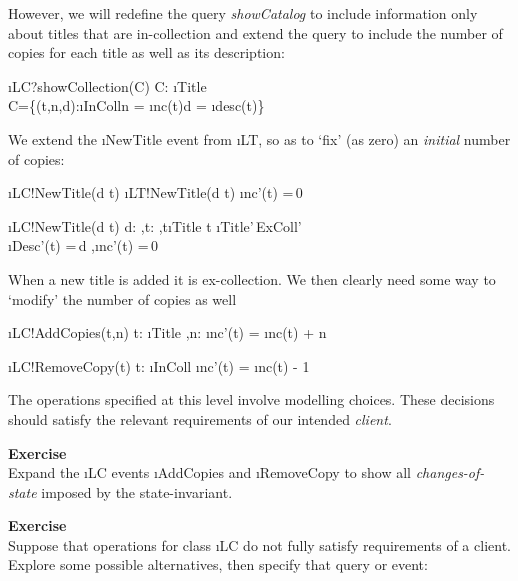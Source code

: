 \documentclass[12pt,a4paper]{article}
\newcounter{exer} %
\newcommand{\exer} %
	{\stepcounter{exer}{\;\arabic{exer}}}
\begin{document}
\newpage
\noindent However, we will redefine the query \emph{showCatalog} to include
information only about titles that are in-collection and extend the query to include the
number of copies for each title as well as its description:
\begin{showspecs}
	\begin{spec}{\i{LC?showCollection(\to C)}}
		C: \i{Title}\pfun{}\!\times{}\\
		C\!=\!\{(t,n,d):\i{InColl}\times{}\!\times{}\bullet n = \i{nc}(t)\wedge d = \i{desc}(t)\}
	\end{spec}
\end{showspecs}


\smallskip\noindent We extend the \i{NewTitle} event from \i{LT},
so as to `fix' (as zero) an \emph{initial} number of copies:
\begin{showspecs}
	\begin{spec}{\i{LC!NewTitle(d \to t)}}
		\i{LT!NewTitle(d \to t)}
	\post	\i{nc'}(t) =\,0
	\end{spec}
\showbeside
	\begin{spec}[\equiv]{\i{LC!NewTitle(d \to t)}}
		d: \sep t: \sep t\notin\i{Title}
	\post	t \in \i{Title'\,\cap ExColl'}\\
		\i{Desc'}(t) =\,d \sep \i{nc'}(t) =\,0
	\end{spec}
\end{showspecs}\smallskip\noindent
\noindent When a new title is added it is ex-collection.
We then clearly need some way to `modify' the number
of copies as well
\begin{showspecs}
	\begin{spec}{\i{LC!AddCopies(t,n)}}	
		t: \i{Title} \sep n: 
	\post	\i{nc'}(t) = \i{nc}(t) + n
	\end{spec}
\showbeside
	\begin{spec}{\i{LC!RemoveCopy(t)}}	
		t: \i{InColl}
	\post	\i{nc'}(t) = \i{nc}(t) - 1
	\end{spec}
\end{showspecs}\medskip\noindent
The operations specified at this level involve modelling choices.
These decisions should satisfy the relevant requirements
of our intended \emph{client}.

\medskip\noindent
\textbf{Exercise}\exer\\
Expand the \i{LC} events \i{AddCopies} and \i{RemoveCopy} to show all
\emph{changes-of-state} imposed by the state-invariant.

\medskip\noindent
\textbf{Exercise}\exer\\
Suppose that operations for class \i{LC} do not fully
satisfy requirements of a client. Explore some possible
alternatives, then specify that query or event:
\end{document}
